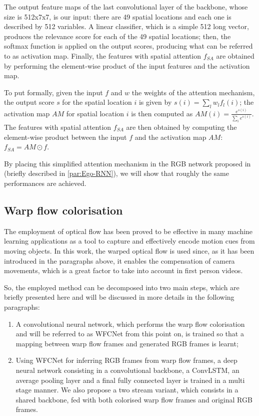 \documentclass[10pt,twocolumn,letterpaper]{article}
\begin{document}
The output feature maps of the last convolutional layer of the backbone, whose size is 512x7x7, is our input: there are 49 spatial locations and each one is described by 512 variables. A linear classifier, which is a simple 512 long vector, produces the relevance score for each of the 49 spatial locations; then, the softmax function is applied on the output scores, producing what can be referred to as activation map. Finally, the features with spatial attention $f_{SA}$ are obtained by performing the element-wise product of the input features and the activation map.

To put formally, given the input $f$ and $w$ the weights of the attention mechanism, the output score $s$ for the spatial location $i$ is given by ${s(i) = \sum_l w_l f_l(i)}$; the activation map $AM$ for spatial location $i$ is then computed as ${AM(i) = \frac{e^{s(i)}}{\sum_i e^{s(i)}}}$. The features with spatial attention $f_{SA}$ are then obtained by computing the element-wise product between the input $f$ and the activation map $AM$: ${f_{SA} = AM \odot f}$.

By placing this simplified attention mechanism in the RGB network proposed in \cite{Ego-RNN} (briefly described in \ref{par:Ego-RNN}), we will show that roughly the same performances are achieved.

\subsection{Warp flow colorisation}

The employment of optical flow has been proved to be effective in many machine learning applications as a tool to capture and effectively encode motion cues from moving objects. In this work, the warped optical flow is used since, as it has been introduced in the paragraphs above, it enables the compensation of camera movements, which is a great factor to take into account in first person videos.

So, the employed method can be decomposed into two main steps, which are briefly presented here and will be discussed in more details in the following paragraphs:
\begin{enumerate}
	\item A convolutional neural network, which performs the warp flow colorisation and will be referred to as WFCNet from this point on, is trained so that a mapping between warp flow frames and generated RGB frames is learnt; 
	\item Using WFCNet for inferring RGB frames from warp flow frames, a deep neural network consisting in a convolutional backbone, a ConvLSTM, an average pooling layer and a final fully connected layer is trained in a multi stage manner. We also propose a two stream variant, which consists in a shared backbone, fed with both colorised warp flow frames and original RGB frames.
\end{enumerate}
\end{document}
